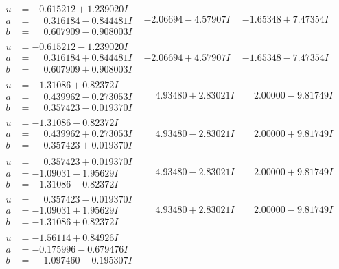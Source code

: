 \documentclass[1p]{elsarticle_modified}
\theoremstyle{definition}
\begin{document}
$$\begin{array}{c|c|c}
\begin{aligned}
u &= -0.615212 + 1.239020 I \\
a &= \phantom{-}0.316184 - 0.844481 I \\
b &= \phantom{-}0.607909 - 0.908003 I\end{aligned}
 & -2.06694 - 4.57907 I & -1.65348 + 7.47354 I \\ \hline\begin{aligned}
u &= -0.615212 - 1.239020 I \\
a &= \phantom{-}0.316184 + 0.844481 I \\
b &= \phantom{-}0.607909 + 0.908003 I\end{aligned}
 & -2.06694 + 4.57907 I & -1.65348 - 7.47354 I \\ \hline\begin{aligned}
u &= -1.31086 + 0.82372 I \\
a &= \phantom{-}0.439962 - 0.273053 I \\
b &= \phantom{-}0.357423 - 0.019370 I\end{aligned}
 & \phantom{-}4.93480 + 2.83021 I & \phantom{-}2.00000 - 9.81749 I \\ \hline\begin{aligned}
u &= -1.31086 - 0.82372 I \\
a &= \phantom{-}0.439962 + 0.273053 I \\
b &= \phantom{-}0.357423 + 0.019370 I\end{aligned}
 & \phantom{-}4.93480 - 2.83021 I & \phantom{-}2.00000 + 9.81749 I \\ \hline\begin{aligned}
u &= \phantom{-}0.357423 + 0.019370 I \\
a &= -1.09031 - 1.95629 I \\
b &= -1.31086 - 0.82372 I\end{aligned}
 & \phantom{-}4.93480 - 2.83021 I & \phantom{-}2.00000 + 9.81749 I \\ \hline\begin{aligned}
u &= \phantom{-}0.357423 - 0.019370 I \\
a &= -1.09031 + 1.95629 I \\
b &= -1.31086 + 0.82372 I\end{aligned}
 & \phantom{-}4.93480 + 2.83021 I & \phantom{-}2.00000 - 9.81749 I \\ \hline\begin{aligned}
u &= -1.56114 + 0.84926 I \\
a &= -0.175996 - 0.679476 I \\
b &= \phantom{-}1.097460 - 0.195307 I\end{aligned}

\end{array}$$
\end{document}

